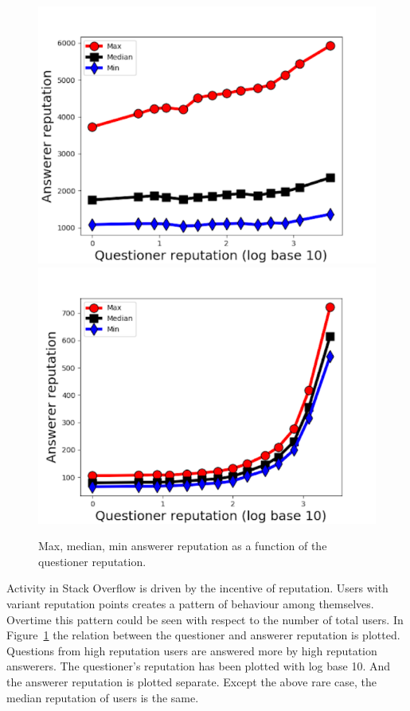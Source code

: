 \begin{figure}[!t]
    \centering
    \includegraphics[width=0.7\columnwidth]{img/Fig3_2010.pdf}
    \includegraphics[width=0.7\columnwidth]{img/Fig3_2017.pdf}
    \caption{Max, median, min answerer reputation as a function of the questioner reputation.}
    \label{fig:fig3}
\end{figure}

Activity in Stack Overflow is driven by the incentive of reputation. Users with variant reputation points creates a pattern of behaviour among themselves. Overtime this pattern could be seen with respect to the number of total users. In Figure~\ref{fig:fig3} the relation between the questioner and answerer reputation is plotted. Questions from high reputation users are answered more by high reputation answerers. The questioner’s reputation has been plotted with log base 10. And the answerer reputation is plotted separate. Except the above rare case, the median reputation of users is the same.

